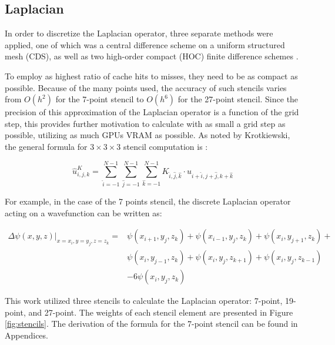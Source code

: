 \subsection{Laplacian}
In order to discretize the Laplacian operator, three separate methods were applied, one of which was a central difference scheme on a uniform structured mesh (CDS), as well as two high-order compact (HOC) finite difference schemes \cite{spotz1996hoc}.

To employ as highest ratio of cache hits to misses, they need to be as compact as possible. Because of the many points used, the accuracy of such stencils varies from $O(h^2)$ for the 7-point stencil to $O(h^6)$ for the 27-point stencil. Since the precision of this approximation of the Laplacian operator is a function of the grid step, this provides further motivation to calculate with as small a grid step as possible, utilizing as much GPUs VRAM as possible. As noted by Krotkiewski, the general formula for $3 \times 3 \times 3$ stencil computation is \cite{krotkiewski2011efficient}:

\begin{equation}
	\hat{u}^K_{i,j,k} = \sum_{\hat{i}=-1}^{N-1}\sum_{\hat{j}=-1}^{N-1}\sum_{\hat{k}=-1}^{N-1}K_{\hat{i},\hat{j},\hat{k}} \cdot u_{i+\hat{i},j+\hat{j},k+\hat{k}}
\end{equation}

For example, in the case of the 7 points stencil, the discrete Laplacian operator acting on a wavefunction can be written as:

\begin{equation}
	\begin{aligned}
		\Delta \psi(x,y,z) \lvert_{x=x_i,y=y_j,z=z_k} =
		& \psi(x_{i+1},y_j,z_k) + \psi(x_{i-1},y_j,z_k) + \psi(x_i,y_{j+1},z_k) + \\
		& \psi(x_i,y_{j-1},z_k) + \psi(x_i,y_j,z_{k+1}) + \psi(x_i,y_j,z_{k-1}) \\
		& -6\psi(x_i,y_j,z_k)
	\end{aligned}
\end{equation}

This work utilized three stencils to calculate the Laplacian operator: 7-point, 19-point, and 27-point. The weights of each stencil element are presented in Figure \ref{fig:stencils}.
The derivation of the formula for the 7-point stencil can be found in Appendices.

